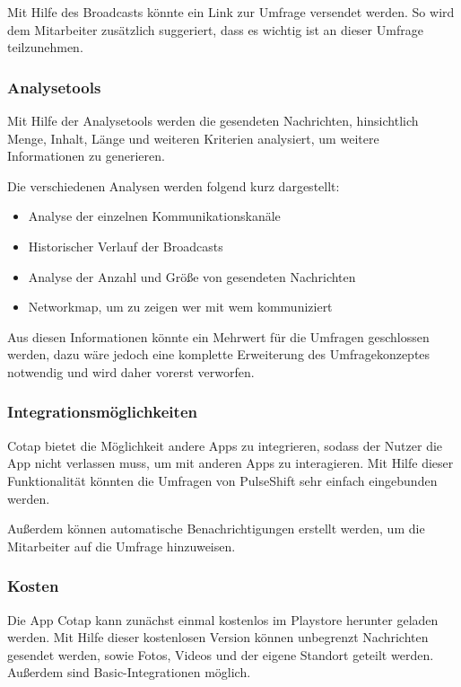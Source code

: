Mit Hilfe des Broadcasts könnte ein Link zur Umfrage versendet werden. So wird dem Mitarbeiter zusätzlich suggeriert, dass es wichtig ist an dieser Umfrage teilzunehmen. 

\subsubsection{Analysetools}
Mit Hilfe der Analysetools werden die gesendeten Nachrichten, hinsichtlich Menge, Inhalt, Länge und weiteren Kriterien analysiert, um weitere Informationen zu generieren. 

Die verschiedenen Analysen werden folgend kurz dargestellt: 

\begin{itemize}
\item Analyse der einzelnen Kommunikationskanäle
\item Historischer Verlauf der Broadcasts
\item Analyse der Anzahl und Größe von gesendeten Nachrichten
\item Networkmap, um zu zeigen wer mit wem kommuniziert
\end{itemize}

Aus diesen Informationen könnte ein Mehrwert für die Umfragen geschlossen werden, dazu wäre jedoch eine komplette Erweiterung des Umfragekonzeptes notwendig und wird daher vorerst verworfen.

\subsubsection{Integrationsmöglichkeiten}
Cotap bietet die Möglichkeit andere Apps zu integrieren, sodass der Nutzer die App nicht verlassen muss, um mit anderen Apps zu interagieren. Mit Hilfe dieser Funktionalität könnten die Umfragen von PulseShift sehr einfach eingebunden werden. 

Außerdem können automatische Benachrichtigungen erstellt werden, um die Mitarbeiter auf die Umfrage hinzuweisen.

\subsubsection{Kosten}
Die App Cotap kann zunächst einmal kostenlos im Playstore herunter geladen werden. Mit Hilfe dieser kostenlosen Version können unbegrenzt Nachrichten gesendet werden, sowie Fotos, Videos und der eigene Standort geteilt werden. Außerdem sind Basic-Integrationen möglich. 

